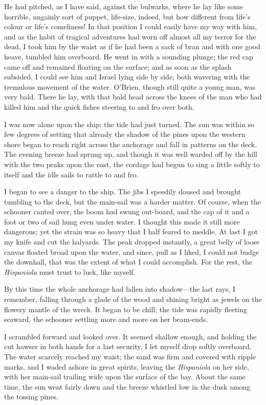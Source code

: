 He had pitched, as I have said, against the bulwarks, where he lay like some horrible, ungainly sort of puppet, life-size, indeed, but how different from life's colour or life's comeliness! In that position I could easily have my way with him, and as the habit of tragical adventures had worn off almost all my terror for the dead, I took him by the waist as if he had been a sack of bran and with one good heave, tumbled him overboard. He went in with a sounding plunge; the red cap came off and remained floating on the surface; and as soon as the splash subsided, I could see him and Israel lying side by side, both wavering with the tremulous movement of the water. O'Brien, though still quite a young man, was very bald. There he lay, with that bald head across the knees of the man who had killed him and the quick fishes steering to and fro over both.

I was now alone upon the ship; the tide had just turned. The sun was within so few degrees of setting that already the shadow of the pines upon the western shore began to reach right across the anchorage and fall in patterns on the deck. The evening breeze had sprung up, and though it was well warded off by the hill with the two peaks upon the east, the cordage had begun to sing a little softly to itself and the idle sails to rattle to and fro.

I began to see a danger to the ship. The jibs I speedily doused and brought tumbling to the deck, but the main-sail was a harder matter. Of course, when the schooner canted over, the boom had swung out-board, and the cap of it and a foot or two of sail hung even under water. I thought this made it still more dangerous; yet the strain was so heavy that I half feared to meddle. At last I got my knife and cut the halyards. The peak dropped instantly, a great belly of loose canvas floated broad upon the water, and since, pull as I liked, I could not budge the downhall, that was the extent of what I could accomplish. For the rest, the \textit{Hispaniola} must trust to luck, like myself.

By this time the whole anchorage had fallen into shadow—the last rays, I remember, falling through a glade of the wood and shining bright as jewels on the flowery mantle of the wreck. It began to be chill; the tide was rapidly fleeting seaward, the schooner settling more and more on her beam-ends.

I scrambled forward and looked over. It seemed shallow enough, and holding the cut hawser in both hands for a last security, I let myself drop softly overboard. The water scarcely reached my waist; the sand was firm and covered with ripple marks, and I waded ashore in great spirits, leaving the \textit{Hispaniola} on her side, with her main-sail trailing wide upon the surface of the bay. About the same time, the sun went fairly down and the breeze whistled low in the dusk among the tossing pines.


